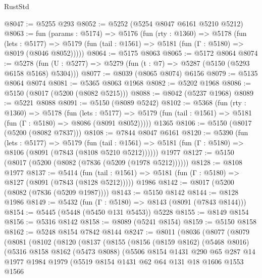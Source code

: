 \begin{lexlean}{RustStd}
\begin{coremodule}
@8047 := @5255 @293
@8052 := @5252 (@5254 @8047 @6161 @5210 @5212)
@8063 := fun (params : @5174) =>
  @5176
    (fun (rty : @1360) =>
    @5178
      (fun (lets : @5177) =>
      @5179 (fun (tail : @1561) => @5181 (fun (Γ : @5180) => @8019 (@8046 @8052)))))
@8064 := @5175 @8063
@8065 := @5172 @8064
@8074 := @5278 (fun (U : @5277) => @5279 (fun (t : @7) => @5287 (@5150 (@5293 @6158 @5168) @5304)))
@8077 := @8039 (@8065 @8074) @6156
@8079 := @5135 @8064 @8074
@8081 := @5365 @8063 @1968
@8082 := @5202 @1968
@8086 := @5150 (@8017 (@5200 (@8082 @5215)))
@8088 := @8042 (@5237 @1968)
@8089 := @5221 @8088
@8091 := @5150 (@8089 @5242)
@8102 := @5368
    (fun (rty : @1360) =>
    @5178
      (fun (lets : @5177) =>
      @5179 (fun (tail : @1561) => @5181 (fun (Γ : @5180) => @8086 (@8091 @8052)))))
    @1365
@8106 := @5150 (@8017 (@5200 (@8082 @7837)))
@8108 := @7844 @8047 @6161
@8120 := @5390
    (fun (lets : @5177) =>
    @5179
      (fun (tail : @1561) => @5181 (fun (Γ : @5180) => @8106 (@8091 (@7843 (@8108 @5210 @5212))))))
    @1977
@8127 := @5150 (@8017 (@5200 (@8082 (@7836 (@5209 (@1978 @5212))))))
@8128 := @8108 @1977
@8137 := @5414
    (fun (tail : @1561) => @5181 (fun (Γ : @5180) => @8127 (@8091 (@7843 (@8128 @5212)))))
    @1986
@8142 := @8017 (@5200 (@8082 (@7836 (@5209 @1987))))
@8143 := @5150 @8142
@8144 := @8128 @1986
@8149 := @5432 (fun (Γ : @5180) => @8143 (@8091 (@7843 @8144)))
@8154 := @5445 (@5448 (@5450 @131 @5453)) @5228
@8155 := @8149 @8154
@8156 := @5316 @8142
@8158 := @8089 (@5241 @8154)
@8159 := @5150 @8158
@8162 := @5248 @8154 @7842 @8144
@8247 := @8011
    (@8036
      (@8077
        (@8079
          (@8081
            (@8102
              (@8120
                (@8137
                  (@8155
                    (@8156
                      (@8159 @8162)
                      (@5468 @8016)
                      (@5316
                        @8158
                        @8162
                        (@5473 @8088)
                        (@5506
                          @8154
                          @1431
                          @290
                          @65
                          @287
                          @14
                          @1977
                          @1984
                          @1979
                          (@5519
                            @8154
                            @1431
                            @62
                            @64
                            @131
                            @18
                            @1606
                            @1553
                            @1566

\end{coremodule}
\end{lexlean}
